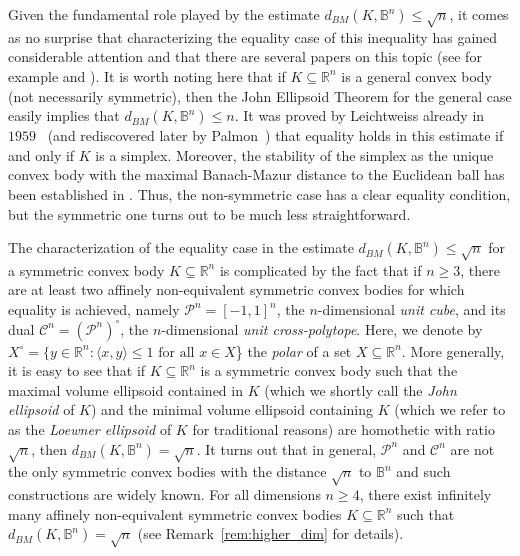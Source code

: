 \documentclass[12pt,a4paper]{article}
\theoremstyle{definition}
\newcommand\R{\mathbb{R}}
\newcommand\B{\mathbb{B}}
\newcommand\CC{\mathcal{C}}
\newcommand\CP{\mathcal{P}}
\newcommand\cemph[1]{\emph{\color{red}#1}}
\begin{document}
Given the fundamental role played by the estimate $d_{BM}(K, \B^n) \leq \sqrt{n}$, it comes as no surprise that characterizing the equality case of this inequality has gained considerable attention and that there are several papers on this topic (see for example \cite{tomczakstructure,lewis,milmanwolfson} and \cite[Chapter~$7$]{tomczak}). It is worth noting here that if $K \subseteq \R^n$ is a general convex body (not necessarily symmetric), then the John Ellipsoid Theorem for the general case easily implies that $d_{BM}(K, \B^n) \leq n$. It was proved by Leichtweiss already in $1959$~\cite{leichtweiss} (and rediscovered later by Palmon~\cite{palmon}) that equality holds in this estimate if and only if $K$ is a simplex. Moreover, the stability of the simplex as the unique convex body with the maximal Banach-Mazur distance to the Euclidean ball has been established in \cite{kobos}. Thus, the non-symmetric case has a clear equality condition, but the symmetric one turns out to be much less straightforward.

The characterization of the equality case in the estimate $d_{BM}(K, \B^n) \leq \sqrt{n}$ for a symmetric convex body $K \subseteq \R^n$ is complicated by the fact that if $n \geq 3$, there are at least two affinely non-equivalent symmetric convex bodies for which equality is achieved, namely $\CP^n = [-1,1]^n$, the $n$-dimensional \cemph{unit cube}, and its dual $\CC^n = (\CP^n)^\circ$, the $n$-dimensional \cemph{unit cross-polytope}. Here, we denote by $X^\circ = \{ y \in \R^n : \langle x, y \rangle \leq 1 \text{ for all } x \in X$\} the \cemph{polar} of a set $X \subseteq \R^n$. More generally, it is easy to see that if $K \subseteq \R^n$ is a symmetric convex body such that the maximal volume ellipsoid contained in $K$ (which we shortly call the \cemph{John ellipsoid} of $K$) and the minimal volume ellipsoid containing $K$ (which we refer to as the \cemph{Loewner ellipsoid} of $K$ for traditional reasons) are homothetic with ratio $\sqrt{n}$, then $d_{BM}(K, \B^n)=\sqrt{n}$. It turns out that in general, $\CP^n$ and $\CC^n$ are not the only symmetric convex bodies with the distance $\sqrt{n}$ to $\B^n$ and such constructions are widely known. For all dimensions $n \geq 4$, there exist infinitely many affinely non-equivalent symmetric convex bodies $K \subseteq \R^n$ such that $d_{BM}(K, \B^n)=\sqrt{n}$ (see Remark~\ref{rem:higher_dim} for details).
\end{document}
